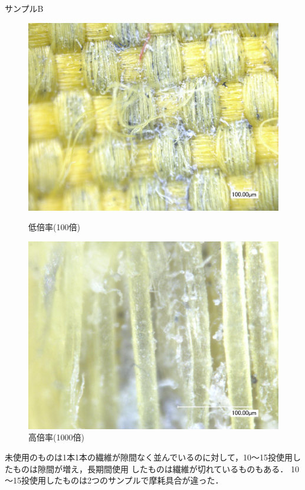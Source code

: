 \documentclass[main]{subfiles}
\begin{document}
\begin{itemize}
    サンプルB
    \begin{figure}[H]
        \centering
        \begin{minipage}[htbp]{0.45\linewidth}
            \centering
            \includegraphics[keepaspectratio, width=0.8\linewidth]{figures/縁/カーリングパッド長期低倍率B.jpg}
            \caption{低倍率(100倍)}
            \label{fig:label}
        \end{minipage}
        \begin{minipage}[htbp]{0.45\linewidth}
            \centering
            \includegraphics[keepaspectratio, width=0.8\linewidth]{figures/縁/カーリングパッド長期B.jpg}
            \caption{高倍率(1000倍)}
            \label{fig:label}
        \end{minipage}
    \end{figure}
\end{itemize}

未使用のものは1本1本の繊維が隙間なく並んでいるのに対して，10～15投使用したものは隙間が増え，長期間使用
したものは繊維が切れているものもある．
10～15投使用したものは2つのサンプルで摩耗具合が違った．
\end{document}
